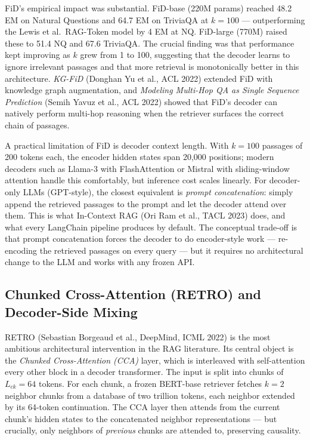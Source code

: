 FiD's empirical impact was substantial. FiD-base (220M params) reached 48.2 EM on Natural Questions and 64.7 EM on TriviaQA at \(k=100\) --- outperforming the Lewis et al.~RAG-Token model by 4 EM at NQ. FiD-large (770M) raised these to 51.4 NQ and 67.6 TriviaQA. The crucial finding was that performance kept improving as \(k\) grew from 1 to 100, suggesting that the decoder learns to ignore irrelevant passages and that more retrieval is monotonically better in this architecture. \emph{KG-FiD} (Donghan Yu et al., ACL 2022) extended FiD with knowledge graph augmentation, and \emph{Modeling Multi-Hop QA as Single Sequence Prediction} (Semih Yavuz et al., ACL 2022) showed that FiD's decoder can natively perform multi-hop reasoning when the retriever surfaces the correct chain of passages.

A practical limitation of FiD is decoder context length. With \(k=100\) passages of 200 tokens each, the encoder hidden states span 20,000 positions; modern decoders such as Llama-3 with FlashAttention or Mistral with sliding-window attention handle this comfortably, but inference cost scales linearly. For decoder-only LLMs (GPT-style), the closest equivalent is \emph{prompt concatenation}: simply append the retrieved passages to the prompt and let the decoder attend over them. This is what In-Context RAG (Ori Ram et al., TACL 2023) does, and what every LangChain pipeline produces by default. The conceptual trade-off is that prompt concatenation forces the decoder to do encoder-style work --- re-encoding the retrieved passages on every query --- but it requires no architectural change to the LLM and works with any frozen API.

\subsection{Chunked Cross-Attention (RETRO) and Decoder-Side Mixing}\label{chunked-cross-attention-retro-and-decoder-side-mixing}

RETRO (Sebastian Borgeaud et al., DeepMind, ICML 2022) is the most ambitious architectural intervention in the RAG literature. Its central object is the \emph{Chunked Cross-Attention (CCA)} layer, which is interleaved with self-attention every other block in a decoder transformer. The input is split into chunks of \(L_{ck} = 64\) tokens. For each chunk, a frozen BERT-base retriever fetches \(k=2\) neighbor chunks from a database of two trillion tokens, each neighbor extended by its 64-token continuation. The CCA layer then attends from the current chunk's hidden states to the concatenated neighbor representations --- but crucially, only neighbors of \emph{previous} chunks are attended to, preserving causality.

